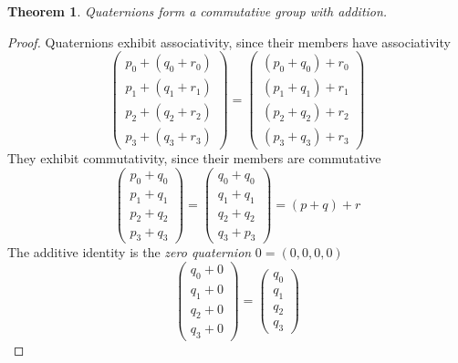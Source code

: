 \documentclass{amsart}
\newtheorem{theorem}{Theorem}[section]
\theoremstyle{definition}
\theoremstyle{remark}
\numberwithin{equation}{section}
\begin{document}
\begin{theorem}
  Quaternions form a commutative group with addition.
\end{theorem}
\begin{proof}
  Quaternions exhibit associativity, since their members have associativity
  \begin{equation}
    \begin{pmatrix}
      p_0 + (q_0 + r_0) \\
      p_1 + (q_1 + r_1) \\
      p_2 + (q_2 + r_2) \\
      p_3 + (q_3 + r_3)
    \end{pmatrix} =
    \begin{pmatrix}
      (p_0 + q_0) + r_0 \\
      (p_1 + q_1) + r_1 \\
      (p_2 + q_2) + r_2 \\
      (p_3 + q_3) + r_3
    \end{pmatrix}
  \end{equation}
  They exhibit commutativity, since their members are commutative
  \begin{equation}
    \begin{pmatrix}
      p_0 + q_0 \\
      p_1 + q_1 \\
      p_2 + q_2 \\
      p_3 + q_3
    \end{pmatrix} =
    \begin{pmatrix}
      q_0 + q_0 \\
      q_1 + q_1 \\
      q_2 + q_2 \\
      q_3 + p_3
    \end{pmatrix} = (p + q) + r
  \end{equation}
  The additive identity is the \emph{zero quaternion} $0=(0, 0, 0, 0)$
  \begin{equation}
    \begin{pmatrix}
      q_0 + 0 \\
      q_1 + 0 \\
      q_2 + 0 \\
      q_3 + 0
    \end{pmatrix} =
    \begin{pmatrix}
      q_0 \\
      q_1 \\
      q_2 \\
      q_3
    \end{pmatrix}

\end{equation}
\end{proof}
\end{document}
